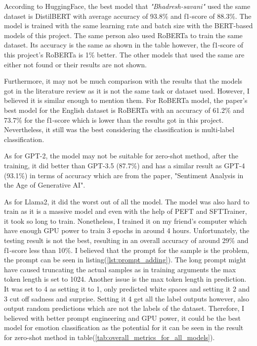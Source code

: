 According to HuggingFace, the best model that \textit{"Bhadresh-savani"} used the same dataset is DistilBERT with average accuracy of 93.8\% and f1-score of 88.3\%\cite{Bhadresh_2023_distilbert}. The model is trained with the same learning rate and batch size with the BERT-based models of this project. The same person also used RoBERTa to train the same dataset\cite{Bhadresh_2023_roberta}. Its accuracy is the same as shown in the table however, the f1-score of this project's RoBERTa is 1\% better. The other models that used the same are either not found or their results are not shown.

Furthermore, it may not be much comparison with the results that the models got in the literature review as it is not the same task or dataset used. However, I believed it is similar enough to mention them. For RoBERTa model, the paper\cite{AMEER2023118534}'s best model for the English dataset is RoBERTa with an accuracy of 61.2\% and 73.7\% for the f1-score which is lower than the results got in this project. Nevertheless, it still was the best considering the classification is multi-label classification. 

As for GPT-2, the model may not be suitable for zero-shot method, after the training, it did better than GPT-3.5 (87.7\%) and has a similar result as GPT-4 (93.1\%) in terms of accuracy which are from the paper, "Sentiment Analysis in the Age of Generative AI"\cite{Krugmann_Hartmann_2024}. 

As for Llama2, it did the worst out of all the model. The model was also hard to train as it is a massive model and even with the help of PEFT and SFTTrainer, it took so long to train. Nonetheless, I trained it on my friend's computer which have enough GPU power to train 3 epochs in around 4 hours. Unfortunately, the testing result is not the best, resulting in an overall accuracy of around 29\% and f1-score less than 10\%. I believed that the prompt for the sample is the problem, the prompt can be seen in listing(\ref{lst:prompt_adding}). The long prompt might have caused truncating the actual samples as in training arguments the max token length is set to 1024. Another issue is the max token length in prediction. It was set to 4 as setting it to 1, only predicted white spaces and setting it 2 and 3 cut off sadness and surprise. Setting it 4 get all the label outputs however, also output random predictions which are not the labels of the dataset. Therefore, I believed with better prompt engineering and GPU power, it could be the best model for emotion classification as the potential for it can be seen in the result for zero-shot method in table(\ref{tab:overall_metrics_for_all_models}).

